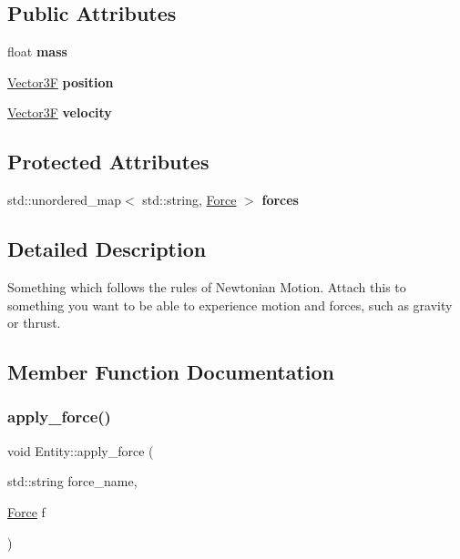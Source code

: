 \subsection*{Public Attributes}
\begin{DoxyCompactItemize}
\item 
\mbox{\label{class_entity_add24892e5b16a278e3b14db150af4e52}} 
float {\bfseries mass}
\item 
\mbox{\label{class_entity_a77bfc31898ca3d4188f71b5e76fd6e58}} 
\mbox{\hyperlink{class_vector3}{Vector3F}} {\bfseries position}
\item 
\mbox{\label{class_entity_ae0860dfc577cec5a59b7b81f1e6b1687}} 
\mbox{\hyperlink{class_vector3}{Vector3F}} {\bfseries velocity}
\end{DoxyCompactItemize}
\subsection*{Protected Attributes}
\begin{DoxyCompactItemize}
\item 
\mbox{\label{class_entity_a01e3b220ff24fdc7b10db579f22c2eb2}} 
std\+::unordered\+\_\+map$<$ std\+::string, \mbox{\hyperlink{class_force}{Force}} $>$ {\bfseries forces}
\end{DoxyCompactItemize}


\subsection{Detailed Description}
Something which follows the rules of Newtonian Motion. Attach this to something you want to be able to experience motion and forces, such as gravity or thrust. 

\subsection{Member Function Documentation}
\mbox{\label{class_entity_a4cc3373fa2900d430a41e9a6b0242109}} 
\subsubsection{\texorpdfstring{apply\+\_\+force()}{apply\_force()}}
{\footnotesize\ttfamily void Entity\+::apply\+\_\+force (\begin{DoxyParamCaption}\item[{std\+::string}]{force\+\_\+name,  }\item[{\mbox{\hyperlink{class_force}{Force}}}]{f }\end{DoxyParamCaption})}

